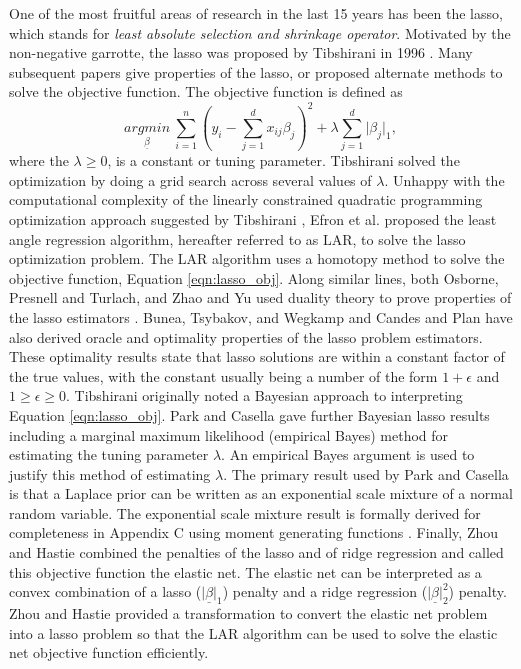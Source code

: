 One of the most fruitful areas of research in the last 15 years has been the lasso, which stands for \emph{least absolute selection and shrinkage operator}. Motivated by the non-negative garrotte, the lasso was proposed by Tibshirani in 1996 \cite{tibshirani1996regression}. Many subsequent papers give properties of the lasso, or proposed alternate methods to solve the objective function. The objective function is defined as
\begin{equation}\label{eqn:lasso_obj}
\underset{\underline{\beta}}{argmin}\ \sum_{i=1}^n(y_i - \sum_{j=1}^dx_{ij}\beta_j)^2 +\lambda\sum_{j=1}^d\vert \beta_j\vert_1,
\end{equation}
 where the $\lambda \geq 0$, is a constant or tuning parameter. Tibshirani solved the optimization by doing a grid search across several values of $\lambda$. Unhappy with the computational complexity of the linearly constrained quadratic programming optimization approach suggested by Tibshirani \cite{tibshirani1996regression}, Efron et al. \cite{efron2004least} proposed the least angle regression algorithm, hereafter referred to as LAR, to solve the lasso optimization problem. The LAR algorithm uses a homotopy method to solve the objective function, Equation \ref{eqn:lasso_obj}. Along similar lines, both Osborne, Presnell and Turlach, and Zhao and Yu used duality theory to prove properties of the lasso estimators \cite{osborne2000lasso,zhao2007model}. Bunea, Tsybakov, and Wegkamp  \cite{bunea2007sparsity} and Candes and Plan  \cite{candes2011tight} have also derived oracle and optimality properties of the lasso problem estimators. These optimality results state that lasso solutions are within a constant factor of the true values, with the constant usually being a number of the form $1+\epsilon$ and $1\geq\epsilon\geq 0$. Tibshirani \cite{tibshirani1996regression} originally noted a Bayesian approach to interpreting Equation \ref{eqn:lasso_obj}. Park and Casella  \cite{park2008bayesian} gave further Bayesian lasso results including a marginal maximum likelihood (empirical Bayes) method for estimating the tuning parameter $\lambda$. An empirical Bayes argument is used to justify this method of estimating $\lambda$. The primary result used by Park and Casella is that a Laplace prior can be written as an exponential scale mixture of a normal random variable. The exponential scale mixture result is formally derived for completeness in Appendix C using moment generating functions .  Finally, Zhou and Hastie \cite{zou2005regularization} combined the penalties of the lasso and of ridge regression and called this objective function the elastic net. The elastic net can be interpreted as a convex combination of a lasso ($\vert \underline{\beta}\vert_1$) penalty and a ridge regression ($\vert \underline{\beta}\vert_2^2$) penalty. Zhou and Hastie \cite{zou2005regularization} provided a transformation to convert the elastic net problem into a lasso problem so that the LAR algorithm can be used to solve the elastic net objective function efficiently.      
 
